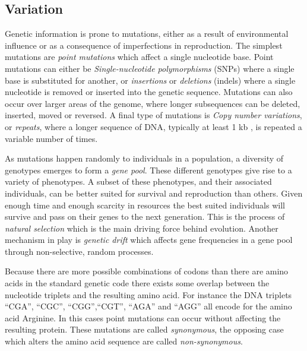 \documentclass[thesis.tex]{subfiles}
\begin{document}
\subsection{Variation}
\label{sec:genetic_variation}
Genetic information is prone to mutations, either as a result of environmental influence or as a consequence of imperfections in reproduction. The simplest mutations are \textit{point mutations} which affect a single nucleotide base. Point mutations can either be \textit{Single-nucleotide polymorphisms} (SNPs) where a single base is substituted for another, or \textit{insertions} or \textit{deletions} (indels) where a single nucleotide is removed or inserted into the genetic sequence. Mutations can also occur over larger areas of the genome, where longer subsequences can be deleted, inserted, moved or reversed. A final type of mutations is \textit{Copy number variations}, or \textit{repeats}, where a longer sequence of DNA, typically at least 1 kb \cite{copy_number_variation_new_insights_in_genome_diversity}, is repeated a variable number of times.\\
\par\noindent
As mutations happen randomly to individuals in a population, a diversity of genotypes emerges to form a \textit{gene pool}. These different genotypes give rise to a variety of phenotypes. A subset of these phenotypes, and their associated individuals, can be better suited for survival and reproduction than others. Given enough time and enough scarcity in resources the best suited individuals will survive and pass on their genes to the next generation. This is the process of \textit{natural selection} which is the main driving force behind evolution. Another mechanism in play is \textit{genetic drift} which affects gene frequencies in a gene pool through non-selective, random processes. \\
\par\noindent
Because there are more possible combinations of codons than there are amino acids in the standard genetic code there exists some overlap between the nucleotide triplets and the resulting amino acid. For instance the DNA triplets ``CGA'', ``CGC'', ``CGG'',``CGT'', ``AGA'' and ``AGG''  all encode for the amino acid Arginine. In this cases point mutations can occur without affecting the resulting protein. These mutations are called \textit{synonymous}, the opposing case which alters the amino acid sequence are called \textit{non-synonymous}.
\end{document}

